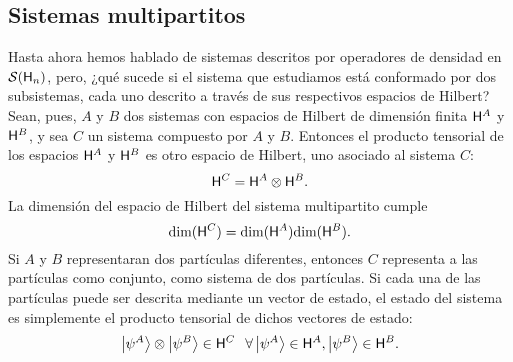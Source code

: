 \subsection{Sistemas multipartitos}\label{sec:Ch1PartialTrace}
Hasta ahora hemos hablado de sistemas descritos por operadores de densidad en $\mathcal{S}({\sf H}_{n})$, pero, ¿qué sucede si el sistema que estudiamos está conformado por dos subsistemas, cada uno descrito a través de sus respectivos espacios de Hilbert? Sean, pues, $A$ y $B$ dos sistemas con espacios de Hilbert de dimensión finita ${\sf H}^{A}$ y ${\sf H}^{B}$, y sea $C$ un sistema compuesto por $A$ y $B$. Entonces el producto tensorial de los espacios ${\sf H}^{A}$ y ${\sf H}^{B}$ es otro espacio de Hilbert, uno asociado al sistema $C$:
 \begin{equation}
     {\sf H}^{C}={\sf H}^{A}\otimes{\sf H}^{B}.\nonumber
 \end{equation}
 La dimensión del espacio de Hilbert del sistema multipartito cumple
\begin{equation}
    \text{dim}({\sf H}^{C})=\text{dim}({\sf H}^{A})\text{dim}({\sf H}^{B}).\nonumber
\end{equation}
Si $A$ y $B$ representaran dos partículas diferentes, entonces $C$ representa a las partículas como conjunto, como sistema de dos partículas. Si cada una de las partículas puede ser descrita mediante un vector de estado, el estado del sistema es simplemente el producto tensorial de dichos vectores de estado:
\begin{equation}
    \ket{\psi^{A}}\otimes\ket{\psi^{B}}\in{\sf H}^{C}\,\; \; \forall\ket{\psi^{A}}\in{\sf H}^{A},\ket{\psi^{B}}\in{\sf H}^{B}.\nonumber
\end{equation}


